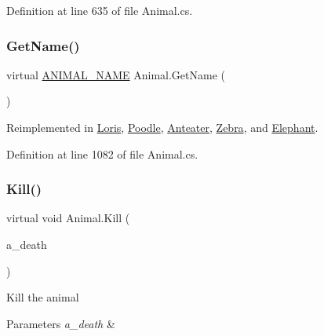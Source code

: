 Definition at line 635 of file Animal.\+cs.

\mbox{\label{class_animal_ab66ea3e3cb15a2b236ba9ba4d589ca69}} 
\subsubsection{\texorpdfstring{Get\+Name()}{GetName()}}
{\footnotesize\ttfamily virtual \mbox{\hyperlink{_animal_8cs_a2fa5713399b84d1b88dae9196837af50}{A\+N\+I\+M\+A\+L\+\_\+\+N\+A\+ME}} Animal.\+Get\+Name (\begin{DoxyParamCaption}{ }\end{DoxyParamCaption})\hspace{0.3cm}{\ttfamily [virtual]}}



Reimplemented in \mbox{\hyperlink{class_loris_afb060974c2d879a9700544f12d0bc819}{Loris}}, \mbox{\hyperlink{class_poodle_a4aa6f80707dff1497fa00f855e28435e}{Poodle}}, \mbox{\hyperlink{class_anteater_a35cbc4139c1215562db29102ed07646a}{Anteater}}, \mbox{\hyperlink{class_zebra_a20dd192a5473bc27ade5c862c9ce7ac4}{Zebra}}, and \mbox{\hyperlink{class_elephant_a838ab3035927faab686cc180cd305481}{Elephant}}.



Definition at line 1082 of file Animal.\+cs.

\mbox{\label{class_animal_a7edafcb2574e25a06224020ed0e5133c}} 
\subsubsection{\texorpdfstring{Kill()}{Kill()}}
{\footnotesize\ttfamily virtual void Animal.\+Kill (\begin{DoxyParamCaption}\item[{\mbox{\hyperlink{_animal_8cs_aa09ea87b75a706096f010aef7b9b1826}{D\+E\+A\+T\+H\+\_\+\+T\+Y\+PE}}}]{a\+\_\+death }\end{DoxyParamCaption})\hspace{0.3cm}{\ttfamily [virtual]}}



Kill the animal 


\begin{DoxyParams}{Parameters}
{\em a\+\_\+death} & \\
\hline
\end{DoxyParams}


